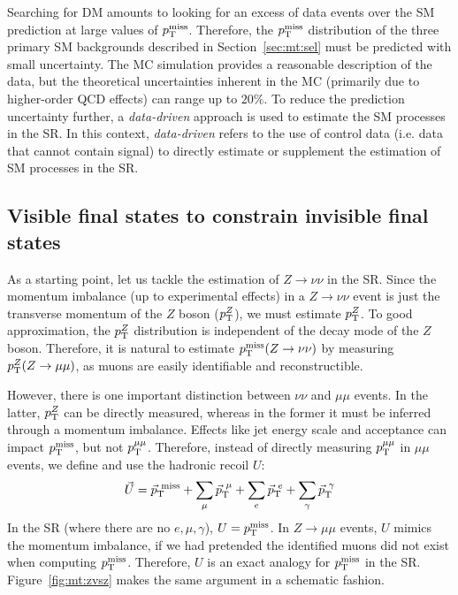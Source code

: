 Searching for DM amounts to looking for an excess of data events over the SM prediction at large values of $p_\mathrm{T}^\mathrm{miss}$.
Therefore, the $p_\mathrm{T}^\mathrm{miss}$ distribution of the three primary SM backgrounds described in Section~\ref{sec:mt:sel} must be predicted with small uncertainty.
The MC simulation provides a reasonable description of the data, but the theoretical uncertainties inherent in the MC (primarily due to higher-order QCD effects) can range up to $20\%$.
To reduce the prediction uncertainty further, a \emph{data-driven} approach is used to estimate the SM processes in the SR.
In this context, \emph{data-driven} refers to the use of control data (i.e. data that cannot contain signal) to directly estimate or supplement the estimation of SM processes in the SR.

\subsection{Visible final states to constrain invisible final states}

As a starting point, let us tackle the estimation of $Z\rightarrow\nu\nu$ in the SR.
Since the momentum imbalance (up to experimental effects) in a $Z\rightarrow\nu\nu$ event is just the transverse momentum of the $Z$ boson ($p_\mathrm{T}^Z$), we must estimate $p_\mathrm{T}^Z$.
To good approximation, the $p_\mathrm{T}^Z$ distribution is independent of the decay mode of the $Z$ boson.
Therefore, it is natural to estimate $p_\mathrm{T}^\mathrm{miss}(Z\rightarrow\nu\nu)$ by measuring $p_\mathrm{T}^Z(Z\rightarrow\mu\mu)$, as muons are easily identifiable and reconstructible.

However, there is one important distinction between $\nu\nu$ and $\mu\mu$ events.
In the latter, $p_\mathrm{T}^Z$ can be directly measured, whereas in the former it must be inferred through a momentum imbalance.
Effects like jet energy scale and acceptance can impact $p_\mathrm{T}^\mathrm{miss}$, but not $p_\mathrm{T}^{\mu\mu}$.
Therefore, instead of directly measuring $p_\mathrm{T}^{\mu\mu}$ in $\mu\mu$ events, we define and use the hadronic recoil $U$:
\begin{equation}
    \vec{U} = \vec{p}_\mathrm{T}^\mathrm{~miss} + \sum_{\mu} \vec{p}_\mathrm{T}^{~\mu} + \sum_{e} \vec{p}_\mathrm{T}^{~e} + \sum_\gamma \vec{p}_\mathrm{T}^{~\gamma}
    \label{eq:u}
\end{equation}
In the SR (where there are no $e,\mu,\gamma$), $U = p_\mathrm{T}^\mathrm{miss}$.
In $Z\rightarrow\mu\mu$ events, $U$ mimics the momentum imbalance, if we had pretended the identified muons did not exist when computing $p_\mathrm{T}^\mathrm{miss}$.
Therefore, $U$ is an exact analogy for $p_\mathrm{T}^\mathrm{miss}$ in the SR.
Figure~\ref{fig:mt:zvsz} makes the same argument in a schematic fashion.


